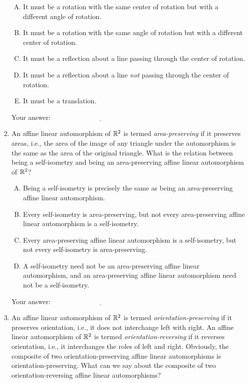 \documentclass[10pt]{amsart}
\begin{document}
\begin{enumerate}
   \begin{enumerate}[(A)]
   \item It must be a rotation with the same center of rotation but
     with a different angle of rotation.
   \item It must be a rotation with the same angle of rotation but with a
     different center of rotation.
  \item It must be a reflection about a line passing through the
    center of rotation.
  \item It must be a reflection about a line {\em not} passing through
    the center of rotation.
  \item It must be a translation.
  \end{enumerate}

  \vspace{0.1in}
  Your answer: $\underline{\qquad\qquad\qquad\qquad\qquad\qquad\qquad}$
  \vspace{0.1in}

\item An affine linear automorphism of $\mathbb{R}^2$ is termed {\em
  area-preserving} if it preserves areas, i.e., the area of the image
  of any triangle under the automorphism is the same as the area of
  the original triangle. What is the relation between being a
  self-isometry and being an area-preserving affine linear
  automorphism of $\mathbb{R}^2$?

  \begin{enumerate}[(A)]
  \item Being a self-isometry is precisely the same as being an
    area-preserving affine linear automorphism.
  \item Every self-isometry is area-preserving, but not every
    area-preserving affine linear automorphism is a self-isometry.
  \item Every area-preserving affine linear automorphism is a
    self-isometry, but not every self-isometry is area-preserving.
  \item A self-isometry need not be an area-preserving affine linear
    automorphism, and an area-preserving affine linear automorphism
    need not be a self-isometry.
  \end{enumerate}

  \vspace{0.1in}
  Your answer: $\underline{\qquad\qquad\qquad\qquad\qquad\qquad\qquad}$
  \vspace{0.1in}

\item An affine linear automorphism of $\mathbb{R}^2$ is termed {\em
  orientation-preserving} if it preserves orientation, i.e., it does
  not interchange left with right. An affine linear automorphism of
  $\mathbb{R}^2$ is termed {\em orientation-reversing} if it reverses
  orientation, i.e., it interchanges the roles of left and
  right. Obviously, the composite of two orientation-preserving affine
  linear automorphisms is orientation-preserving. What can we say
  about the composite of two orientation-reversing affine linear
  automorphisms?


\end{enumerate}
\end{document}
